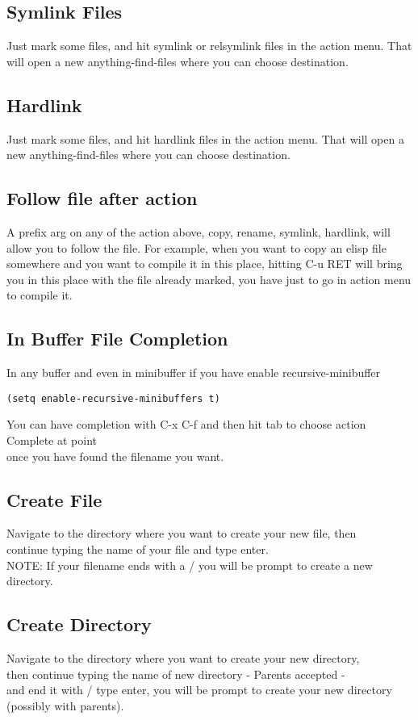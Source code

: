 \documentclass[a4paper,11pt]{article}
\begin{document}
\subsection{Symlink Files}
\label{sec:symlink-files}
Just mark some files, and hit symlink or relsymlink files in the action menu.
That will open a new anything-find-files where you can choose destination.
\subsection{Hardlink}
\label{sec:hardlink}
Just mark some files, and hit hardlink files in the action menu.
That will open a new anything-find-files where you can choose destination.

\subsection{Follow file after action}
\label{sec:follow-file-after}
A prefix arg on any of the action above, copy, rename, symlink, hardlink, will
allow you to follow the file.
For example, when you want to copy an elisp file somewhere and you want to compile it in this place,
hitting C-u RET will bring you in this place with the file already marked, you have just to go in action menu to
compile it.  

\subsection{In Buffer File Completion}
\label{sec:buff-file-compl}
In any buffer and even in minibuffer if you have enable recursive-minibuffer
\begin{verbatim}
(setq enable-recursive-minibuffers t)
\end{verbatim}
You can have completion with C-x C-f and then hit tab to choose action Complete at point \\ 
once you have found the filename you want.
\subsection{Create File}
\label{sec:create-file}
Navigate to the directory where you want to create your new file, then \\
continue typing the name of your file and type enter. \\
NOTE: If your filename ends with a / you will be prompt to create a new directory.

\subsection{Create Directory}
\label{sec:create-directory}
Navigate to the directory where you want to create your new directory, \\
then continue typing the name of new directory - Parents accepted - \\
and end it with / type enter, you will be prompt to create your new directory (possibly with parents).
\end{document}
